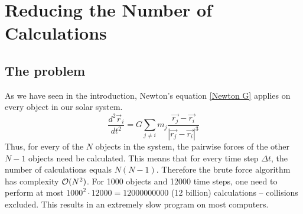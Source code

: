 \section{Reducing the Number of Calculations}\label{sec:barnes}
\subsection{The problem}
As we have seen in the introduction, Newton's equation \eqref{Newton G} applies on every object in our solar system.
\begin{equation}
\frac{d^2\vec{r}_i}{dt^2}=G\sum_{j\neq i}m_j\frac{\vec{r_j}-\vec{r_i}}{|\vec{r_j}-\vec{r_i}|^3}
\label{Newton G}
\end{equation}
 Thus, for every of the $N$ objects in the system, the pairwise forces of the other $N-1$ objects need be calculated. This means that for every time step $\Delta t$, the number of calculations equals $N(N-1)$. Therefore the brute force algorithm has complexity $\mathcal{O}(N^2)$. For 1000 objects and 12000 time steps, one need to perform at most $1000^2\cdot 12000 = 12000000000$ (12 billion) calculations -- collisions excluded. This results in an extremely slow program on most computers.
